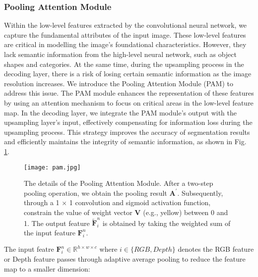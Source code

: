 \documentclass{aims}
\numberwithin{equation}{section}
\begin{document}
\subsubsection{Pooling Attention Module}
Within the low-level features extracted by the convolutional neural network, we capture the fundamental attributes of the input image. These low-level features are critical in modelling the image's foundational characteristics. However, they lack semantic information from the high-level neural network, such as object shapes and categories. At the same time, during the upsampling process in the decoding layer, there is a risk of losing certain semantic information as the image resolution increases. We introduce the Pooling Attention Module (PAM) to address this issue. The PAM module enhances the representation of these features by using an attention mechanism to focus on critical areas in the low-level feature map. In the decoding layer, we integrate the PAM module's output with the upsampling layer's input, effectively compensating for information loss during the upsampling process. This strategy improves the accuracy of segmentation results and efficiently maintains the integrity of semantic information, as shown in Fig. \ref{fig:pam}.

\begin{figure}[t]
	\centering
		\centering
\centering
\texttt{[image: pam.jpg]}
\caption{The details of the Pooling Attention Module. After a two-step pooling operation, we obtain the pooling result $\bm A^\prime$. Subsequently, through a 1 $\times$ 1 convolution and sigmoid activation function, constrain the value of weight vector $\bm V$ (e.g., yellow) between 0 and 1. The output feature $\tilde{\bm F}_{i}^{n}$ is obtained by taking the weighted sum of the input feature ${\bm F}_{i}^{n}$.\label{fig:pam}}
\end{figure}

The input featre $\bm {\bm F}_{i}^{n}\in{\mathbb{R}}^{h\times w \times c}$ where $ i\in \{RGB,Depth\}$ denotes the RGB feature or Depth feature passes through adaptive average pooling to reduce the feature map to a smaller dimension:
\end{document}
